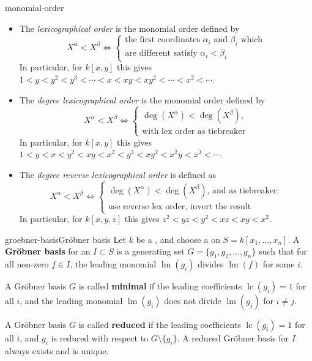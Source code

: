 \begin{example}{monomial-order}
    \begin{itemize}
        \item The \textit{lexicographical order} is the monomial order defined by
        \[ X^\alpha < X^\beta \iff \left\{ \begin{array}{l} \text{the first coordinates $\alpha_i$ and $\beta_i$ which} \\ \text{are different satisfy $\alpha_i < \beta_i$} \end{array} \right. \]
        In particular, for $k[x, y]$ this gives $1 < y < y^2 < y^3 < \cdots < x < xy < xy^2 < \cdots < x^2 < \cdots$.
        \item The \textit{degree lexicographical order} is the monomial order defined by
        \[ X^\alpha < X^\beta \iff \left\{ \begin{array}{l} \text{$\deg(X^\alpha) < \deg(X^\beta)$,} \\ \text{with lex order as tiebreaker} \end{array} \right. \]
        In particular, for $k[x, y]$ this gives $1 < y < x < y^2 < xy < x^2 < y^3 < x y^2 < x^2 y < x^3 < \cdots$.
        \item The \textit{degree reverse lexicographical order} is defined as
        \[ X^\alpha < X^\beta \iff \left\{ \begin{array}{l} \text{$\deg(X^\alpha) < \deg(X^\beta)$, and as tiebreaker:} \\ \text{use reverse lex order, invert the result} \end{array} \right. \]
        In particular, for $k[x, y, z]$ this gives $z^2 < yz < y^2 < xz < xy < x^2$.
    \end{itemize}
\end{example}

\begin{topic}{groebner-basis}{Gröbner basis}
    Let $k$ be a , and choose a  on $S = k[x_1, \ldots, x_n]$. A \textbf{Gröbner basis} for an  $I \subset S$ is a generating set $G = \{ g_1, g_2, \ldots, g_n \}$ such that for all non-zero $f \in I$, the leading monomial $\operatorname{lm}(g_i)$ divides $\operatorname{lm}(f)$ for some $i$.
    
    A Gröbner basis $G$ is called \textbf{minimal} if the leading coefficients $\operatorname{lc}(g_i) = 1$ for all $i$, and the leading monomial $\operatorname{lm}(g_i)$ does not divide $\operatorname{lm}(g_j)$ for $i \ne j$.
    
    A Gröbner basis $G$ is called \textbf{reduced} if the leading coefficients $\operatorname{lc}(g_i) = 1$ for all $i$, and $g_i$ is reduced with respect to $G \setminus \{ g_i \}$. A reduced Gröbner basis for $I$ always exists and is unique.
\end{topic}

